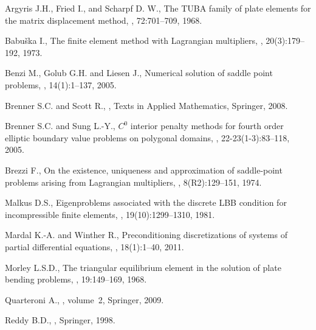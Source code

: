 \documentclass{marine_2015}
\begin{document}
%
\newpage
\begin{thebibliography}{16}

Argyris J.H., Fried I., and Scharpf D. W.,
\newblock
The TUBA family of plate elements for the matrix displacement method,
, 72:701--709, 1968.

Babu\v{s}ka I.,
\newblock The finite element method with Lagrangian multipliers,
, 20(3):179--192, 1973.

Benzi M., Golub G.H. and Liesen J.,
\newblock Numerical solution of saddle point problems,
, 14(1):1--137, 2005.

Brenner S.C. and Scott R.,
,
\newblock Texts in Applied Mathematics, Springer, 2008.

Brenner S.C. and Sung L.-Y.,
\newblock $C^0$ interior penalty methods for fourth order elliptic boundary value
  problems on polygonal domains,
, 22-23(1-3):83--118, 2005.

Brezzi F.,
\newblock On the existence, uniqueness and approximation of saddle-point
  problems arising from Lagrangian multipliers,
, 8(R2):129--151, 1974.

Malkus D.S.,
\newblock Eigenproblems associated with the discrete LBB condition for
  incompressible finite elements,
,
  19(10):1299--1310, 1981.

Mardal K.-A. and Winther R.,
\newblock Preconditioning discretizations of systems of partial differential
  equations,
, 18(1):1--40, 2011.

Morley L.S.D.,
\newblock The triangular equilibrium element in the solution of plate bending
  problems,
, 19:149--169, 1968.

Quarteroni A.,
, volume~2,
\newblock Springer, 2009.

Reddy B.D.,
,
\newblock Springer, 1998.


\end{thebibliography}
\end{document}
